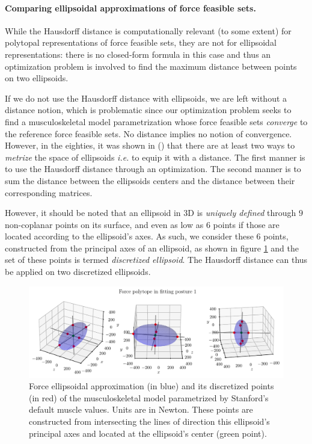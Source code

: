 \paragraph*{Comparing ellipsoidal approximations of force feasible sets.}
While the Hausdorff distance is computationally relevant (to some extent) for polytopal representations of force feasible sets, they are not for ellipsoidal representations: there is no closed-form formula in this case and thus an optimization problem is involved to find the maximum distance between points on two ellipsoids.

If we do not use the Hausdorff distance with ellipsoids, we are left without a distance notion, which is problematic since our optimization problem seeks to find a musculoskeletal model parametrization whose force feasible sets \emph{converge} to the reference force feasible sets. No distance implies no notion of convergence. However, in the eighties, it was shown in (\cite{goffinRelationshipHausdorffDistance1983}) that there are at least two ways to \emph{metrize} the space of ellipsoids \emph{i.e.} to equip it with a distance. The first manner is to use the Hausdorff distance through an optimization. The second manner is to sum the distance between the ellipsoids centers and the distance between their corresponding matrices. 

However, it should be noted that an ellipsoid in 3D is \emph{uniquely defined} through $9$ non-coplanar points on its surface, and even as low as $6$ points if those are located according to the ellipsoid's axes. As such, we consider these 6 points, constructed from the principal axes of an ellipsoid, as shown in figure \ref{fig:ellipsoid_discretization} and the set of these points is termed \emph{discretized ellipsoid}. The Hausdorff distance can thus be applied on two discretized ellipsoids.

\begin{figure}[!htb]
    \centering
    \captionsetup{justification=centering}
    \begin{minipage}{\linewidth}
        \centering
        \includegraphics[trim={0 0 0 20}, clip, width=1\linewidth]{img/chapter_4/imgs_discretization/STANFORD_POSTURE_FITTING_01.pdf}
    \end{minipage}
    \caption{Force ellipsoidal approximation (in blue) and its discretized points (in red) of the musculoskeletal model parametrized by Stanford's default muscle values. Units are in Newton. These points are constructed from intersecting the lines of direction this ellipsoid's principal axes and located at the ellipsoid's center (green point).}
    \label{fig:ellipsoid_discretization}
\end{figure}

